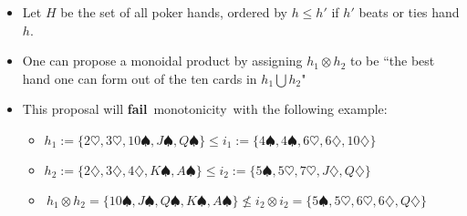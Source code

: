 
\begin{itemize}
    \item Let $H$ be the set of all poker hands, ordered by $h \leq h'$ if $h'$ beats or ties hand $h$.
    \item One can propose a monoidal product by assigning $h_1 \otimes h_2$ to be ``the best hand one can form out of the ten cards in $h_1 \bigcup h_2$"
    \item This proposal will \textbf{fail} \,monotonicity\, with the following example:
          \begin{itemize}
            \item $h_1 := \{2\heartsuit, 3\heartsuit,10 \spadesuit,J\spadesuit,Q\spadesuit\} \leq i_1 := \{4\spadesuit,4\spadesuit,6\heartsuit,6\diamondsuit,10\diamondsuit\}$
            \item $h_2 := \{2\diamondsuit,3\diamondsuit,4\diamondsuit,K\spadesuit,A\spadesuit\} \leq i_2 := \{5\spadesuit,5\heartsuit,7\heartsuit,J\diamondsuit,Q\diamondsuit\}$
            \item \,$h_1 \otimes h_2=\{10\spadesuit,J\spadesuit,Q\spadesuit,K\spadesuit,A\spadesuit\} \not \leq i_2 \otimes i_2 = \{5\spadesuit, 5\heartsuit,6\heartsuit,6\diamondsuit,Q\diamondsuit\}$\,
          \end{itemize}
  \end{itemize}
  